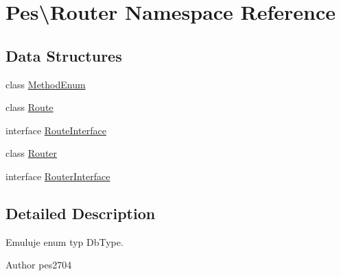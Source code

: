 \hypertarget{namespace_pes_1_1_router}{}\section{Pes\textbackslash{}Router Namespace Reference}
\label{namespace_pes_1_1_router}
\subsection*{Data Structures}
\begin{DoxyCompactItemize}
\item 
class \mbox{\hyperlink{class_pes_1_1_router_1_1_method_enum}{Method\+Enum}}
\item 
class \mbox{\hyperlink{class_pes_1_1_router_1_1_route}{Route}}
\item 
interface \mbox{\hyperlink{interface_pes_1_1_router_1_1_route_interface}{Route\+Interface}}
\item 
class \mbox{\hyperlink{class_pes_1_1_router_1_1_router}{Router}}
\item 
interface \mbox{\hyperlink{interface_pes_1_1_router_1_1_router_interface}{Router\+Interface}}
\end{DoxyCompactItemize}


\subsection{Detailed Description}
Emuluje enum typ Db\+Type.

\begin{DoxyAuthor}{Author}
pes2704 
\end{DoxyAuthor}
